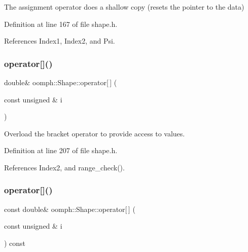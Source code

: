 The assignment operator does a shallow copy (resets the pointer to the data) 

Definition at line 167 of file shape.\+h.



References Index1, Index2, and Psi.

\mbox{\label{classoomph_1_1Shape_ad8ec7c6b2575de50c32ed7c15f38d52f}} 
\subsubsection{\texorpdfstring{operator[]()}{operator[]()}\hspace{0.1cm}{\footnotesize\ttfamily [1/2]}}
{\footnotesize\ttfamily double\& oomph\+::\+Shape\+::operator\mbox{[}$\,$\mbox{]} (\begin{DoxyParamCaption}\item[{const unsigned \&}]{i }\end{DoxyParamCaption})\hspace{0.3cm}{\ttfamily [inline]}}



Overload the bracket operator to provide access to values. 



Definition at line 207 of file shape.\+h.



References Index2, and range\+\_\+check().

\mbox{\label{classoomph_1_1Shape_a08939245bc26cbb5d833fbebecfc8958}} 
\subsubsection{\texorpdfstring{operator[]()}{operator[]()}\hspace{0.1cm}{\footnotesize\ttfamily [2/2]}}
{\footnotesize\ttfamily const double\& oomph\+::\+Shape\+::operator\mbox{[}$\,$\mbox{]} (\begin{DoxyParamCaption}\item[{const unsigned \&}]{i }\end{DoxyParamCaption}) const\hspace{0.3cm}{\ttfamily [inline]}}



